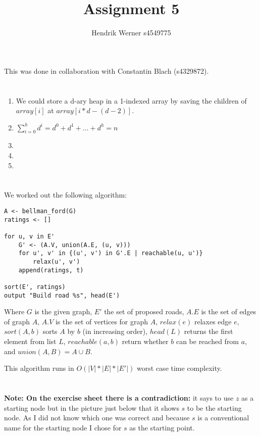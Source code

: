 \documentclass[12pt]{article}
\title {Assignment 5}
\author {Hendrik Werner s4549775}
\begin{document}
\maketitle

This was done in collaboration with Constantin Blach (s4329872).

\section{} %
\begin{enumerate}[a]
	\item %
	We could store a d-ary heap in a 1-indexed array by saving the children of $array[i]$ at $array[i * d - (d - 2)]$.

	\item %
	$\sum_{i = 0}^{h} d^i = d^0 + d^1 + \dots + d^h = n$

	\item %
	\item %
	\item %
\end{enumerate}

\section{} %
We worked out the following algorithm:

\begin{lstlisting}
A <- bellman_ford(G)
ratings <- []

for u, v in E'
	G' <- (A.V, union(A.E, (u, v)))
	for u', v' in {(u', v') in G'.E | reachable(u, u')}
		relax(u', v')
	append(ratings, t)

sort(E', ratings)
output "Build road %s", head(E')
\end{lstlisting}

Where $G$ is the given graph, $E'$ the set of proposed roads, $A.E$ is the set of edges of graph $A$, $A.V$ is the set of vertices for graph $A$, $relax(e)$ relaxes edge $e$, $sort(A, b)$ sorts $A$ by $b$ (in increasing order), $head(L)$ returns the first element from list $L$, $reachable(a, b)$ return whether $b$ can be reached from $a$, and $union(A, B) = A \cup B$.

This algorithm runs in $O(|V| * |E| * |E'|)$ worst case time complexity.

\section{} %
\textbf{Note: On the exercise sheet there is a contradiction:} it says to use $z$ as a starting node but in the picture just below that it shows $s$ to be the starting node. As I did not know which one was correct and because $s$ is a conventional name for the starting node I chose for $s$ as the starting point.
\end{document}

